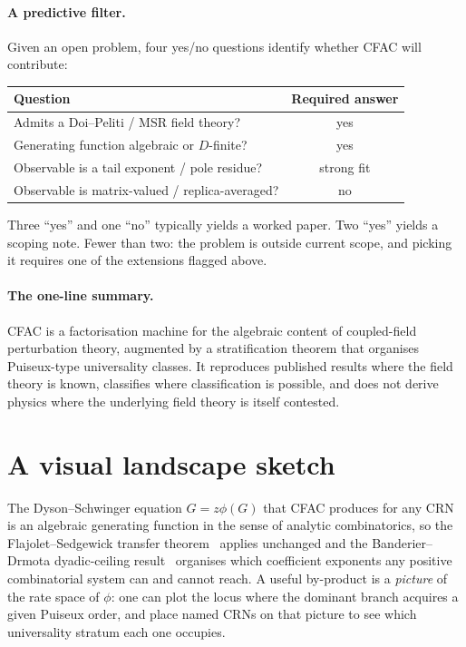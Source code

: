 \documentclass[11pt,a4paper]{article}
\theoremstyle{plain}
\theoremstyle{definition}
\begin{document}
\paragraph{A predictive filter.}
Given an open problem, four yes/no questions identify whether
CFAC will contribute:
\begin{center}
\small
\begin{tabular}{@{}lc@{}}
  \toprule
  Question & Required answer \\
  \midrule
  Admits a Doi--Peliti / MSR field theory? & yes \\
  Generating function algebraic or $D$-finite? & yes \\
  Observable is a tail exponent / pole residue? & strong fit \\
  Observable is matrix-valued / replica-averaged? & no \\
  \bottomrule
\end{tabular}
\end{center}
Three ``yes'' and one ``no'' typically yields a worked paper.  Two
``yes'' yields a scoping note.  Fewer than two: the problem is
outside current scope, and picking it requires one of the extensions
flagged above.

\paragraph{The one-line summary.}
CFAC is a factorisation machine for the algebraic content of
coupled-field perturbation theory, augmented by a stratification
theorem that organises Puiseux-type universality classes.  It
reproduces published results where the field theory is known,
classifies where classification is possible, and does not derive
physics where the underlying field theory is itself contested.

\appendix
\section{A visual landscape sketch}
\label{app:landscape}

The Dyson--Schwinger equation $G = z\phi(G)$ that CFAC produces
for any CRN is an algebraic generating function in the sense of
analytic combinatorics, so the Flajolet--Sedgewick transfer
theorem~\citep{FlajoletSedgewick,FlajoletOdlyzko1990} applies
unchanged and the Banderier--Drmota dyadic-ceiling
result~\citep{BanderierDrmota2015} organises which coefficient
exponents any positive combinatorial system can and cannot reach.
A useful by-product is a \emph{picture} of the rate space of
$\phi$: one can plot the locus where the dominant branch acquires
a given Puiseux order, and place named CRNs on that picture to
see which universality stratum each one occupies.
\end{document}

